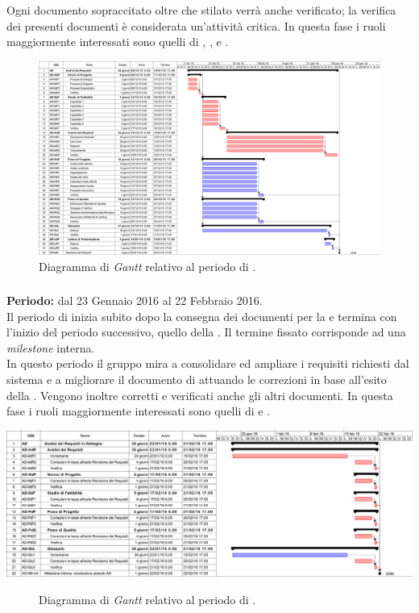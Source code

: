 Ogni documento sopraccitato oltre che stilato verrà anche verificato; la verifica dei presenti documenti è considerata un'attività critica.
In questa fase i ruoli maggiormente interessati sono quelli di \textit{\Amm}, \textit{\Res}, \textit{\Ana} e \textit{\Ver}. 
\begin{figure}
	\centering
	\includegraphics[keepaspectratio = true, width=23cm]{immagini/PdP_AnalisiDeiRequisitiGantt.png}
	\caption{Diagramma di \textit{Gantt} relativo al periodo di \AR.}\label{etichetta}
\end{figure}
\newpage

\subsubsection{\AD}
\textbf{Periodo:} dal 23 Gennaio 2016 al 22 Febbraio 2016. \\
Il periodo di \AD inizia subito dopo la consegna dei documenti per la \RR e termina con l'inizio del periodo successivo, quello della \PA. Il termine fissato corrisponde ad una \textit{milestone} interna. \\
In questo periodo il gruppo mira a consolidare ed ampliare i requisiti richiesti dal sistema e a migliorare il documento di \textit{\AdR} attuando le correzioni in base all'esito della \RR.
Vengono inoltre corretti e verificati anche gli altri documenti. 
In questa fase i ruoli maggiormente interessati sono quelli di \textit{\Ana} e \textit{\Ver}.  
\begin{center}
	\includegraphics[keepaspectratio = true, width=16cm]{immagini/PdP_AnalisiDeiRequisitiInDettaglioGantt.png}
\end{center}
\begin{figure}[h]
	\caption{Diagramma di \textit{Gantt} relativo al periodo di \AD.}\label{etichetta}
\end{figure}

